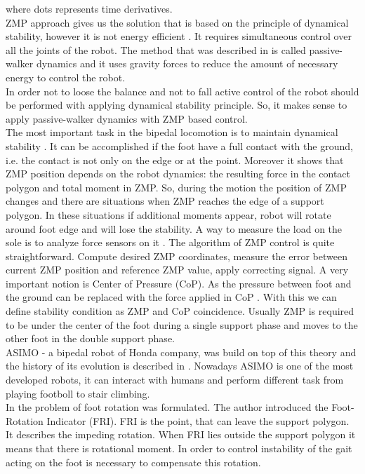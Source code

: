 \documentclass[12pt,a4paper]{report}
\begin{document}
		where dots represents time derivatives.\\
		
		ZMP approach gives us the solution that is based on the principle of dynamical stability, however it is not energy efficient \cite{manchester2011stable}. It requires simultaneous control over all the joints of the robot. The method that was described in \cite{collins2001three} is called passive-walker dynamics and it uses gravity forces to reduce the amount of necessary energy to control the robot.\\
		
		In order not to loose the balance and not to fall active control of the robot should be performed with applying dynamical stability principle. So, it makes sense to apply passive-walker dynamics with ZMP based control.\\
		
		The most important task in the bipedal locomotion is to maintain dynamical stability \cite{vukobratovic2004zero}. It can be accomplished if the foot have a full contact with the ground, i.e. the contact is not only on the edge or at the point. Moreover it shows that ZMP position depends on the robot dynamics: the resulting force in the contact polygon and total moment in ZMP. So, during the motion the position of ZMP changes and there are situations when ZMP reaches the edge of a support polygon. In these situations if additional moments appear, robot will rotate around foot edge and will lose the stability. A way to measure the load on the sole is to analyze force sensors on it \cite{vukobratovic2004zero}. The algorithm of ZMP control is quite straightforward. Compute desired ZMP coordinates, measure the error between current ZMP position and reference ZMP value, apply correcting signal. A very important notion is Center of Pressure (CoP). As the pressure between foot and the ground can be replaced with the force applied in CoP \cite{vukobratovic2004zero}. With this we can define stability condition as ZMP and CoP coincidence. Usually ZMP is required to be under the center of the foot during a single support phase and moves to the other foot in the double support phase.\\
		ASIMO - a bipedal robot of Honda company, was build on top of this theory and the history of its evolution is described in \cite{hirai1998development}. Nowadays ASIMO is one of the most developed robots, it can interact with humans and perform different task  from playing footboll to stair climbing.\\ 
		In \cite{goswami1999postural} the problem of foot rotation was formulated. The author introduced the Foot-Rotation Indicator (FRI). FRI is the point, that can leave the support polygon. It describes the impeding rotation. When FRI lies outside the support polygon it means that there is rotational moment. In order to control instability of the gait acting on the foot is necessary to compensate this rotation.
\end{document}
